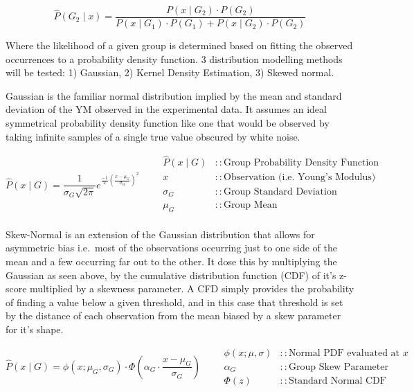 \documentclass[
  paper=a4,
  ,captions=tableheading
]{scrartcl}
\begin{document}
\[ \hat{P}(G_2 \mid x) = \frac{P(x \mid G_2) \cdot P(G_2)}{P(x \mid G_1) \cdot P(G_1) + P(x \mid G_2) \cdot P(G_2)}\]

Where the likelihood of a given group is determined based on fitting the
observed occurrences to a probability density function. 3 distribution
modelling methods will be tested: 1) Gaussian, 2) Kernel Density
Estimation, 3) Skewed normal.

Gaussian is the familiar normal distribution implied by the mean and
standard deviation of the YM observed in the experimental data. It
assumes an ideal symmetrical probability density function like one that
would be observed by taking infinite samples of a single true value
obscured by white noise.

\[
{  
\hat{P}(x \mid G) =  
\frac{1}{\sigma_{G} \sqrt{2 \pi}}  
e^{\tfrac{-1}{2}  
\left( \tfrac{x-\mu_{G}}{\sigma_{G}}\right)^{2}}  
}
\qquad  
\begin{align}  
\hat{P}(x \mid G) &:: \text{Group Probability Density Function}\\
x           &:: \text{Observation (i.e. Young's Modulus)}\\
\sigma_{G}  &:: \text{Group Standard Deviation}\\
\mu_{G}     &:: \text{Group Mean}\\
\end{align}
\]

Skew-Normal is an extension of the Gaussian distribution that allows for
asymmetric bias i.e.~most of the observations occurring just to one side
of the mean and a few occurring far out to the other. It dose this by
multiplying the Gaussian as seen above, by the cumulative distribution
function (CDF) of it's z-score multiplied by a skewness parameter. A CFD
simply provides the probability of finding a value below a given
threshold, and in this case that threshold is set by the distance of
each observation from the mean biased by a skew parameter for it's
shape.

\[
{
\hat{P}(x \mid G) =  
\phi\left(x; \mu_G, \sigma_G \right)
\cdot  
\Phi\left(  
\alpha_G \cdot \frac{x - \mu_G}{\sigma_G}  
\right)
}
\qquad
\begin{align}
\phi(x; \mu, \sigma) &:: \text{Normal PDF evaluated at } x \\
\alpha_G          &:: \text{Group Skew Parameter} \\
\Phi(z)           &:: \text{Standard Normal CDF}
\end{align}
\]
\end{document}
